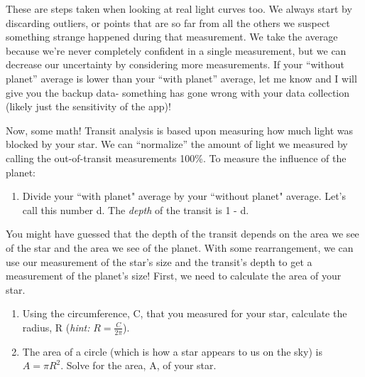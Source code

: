 \documentclass[12pt]{article}
\begin{document}
\noindent
These are steps taken when looking at real light curves too. We always start by discarding outliers, or points that are so far from all the others we suspect something strange happened during that measurement. We take the average because we’re never completely confident in a single measurement, but we can decrease our uncertainty by considering more measurements. If your “without planet” average is lower than your “with planet” average, let me know and I will give you the backup data- something has gone wrong with your data collection (likely just the sensitivity of the app)! 

\medskip \noindent
Now, some math! Transit analysis is based upon measuring how much light was blocked by your star. We can “normalize” the amount of light we measured by calling the out-of-transit measurements 100\%. To measure the influence of the planet:
\begin{enumerate}[label=\textbf{Step \arabic*:},resume]
    \item Divide your ``with planet" average by your ``without planet" average.  Let's call this number d.  The \textit{depth} of the transit is 1 - d.
\end{enumerate}

\noindent
You might have guessed that the depth of the transit depends on the area we see of the star and the area we see of the planet. With some rearrangement, we can use our measurement of the star’s size and the transit’s depth to get a measurement of the planet’s size! First, we need to calculate the area of your star.

\begin{enumerate}[label=\textbf{Step \arabic*:},resume]
    \item Using the circumference, C, that you measured for your star, calculate the radius, R (\textit{hint: }$R = \frac{C}{2\pi}$).
    \item The area of a circle (which is how a star appears to us on the sky) is $A = \pi R^2$.  Solve for the area, A, of your star.
\end{enumerate}
\end{document}
